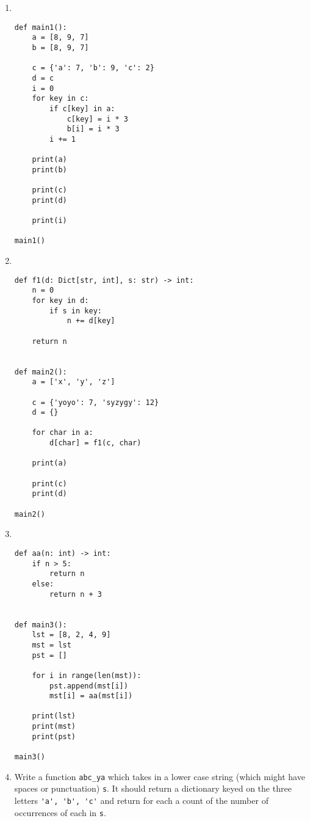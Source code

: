 \documentclass{article}
\begin{document}
\begin{enumerate}

\item \
\begin{verbatim}
def main1():
    a = [8, 9, 7]
    b = [8, 9, 7]

    c = {'a': 7, 'b': 9, 'c': 2}
    d = c
    i = 0
    for key in c:
        if c[key] in a:
            c[key] = i * 3
            b[i] = i * 3
        i += 1

    print(a)
    print(b)

    print(c)
    print(d)

    print(i)

main1()
\end{verbatim}




\newpage

\item \
\begin{verbatim}
def f1(d: Dict[str, int], s: str) -> int:
    n = 0
    for key in d:
        if s in key:
            n += d[key]

    return n


def main2():
    a = ['x', 'y', 'z']

    c = {'yoyo': 7, 'syzygy': 12}
    d = {}

    for char in a:
        d[char] = f1(c, char)

    print(a)

    print(c)
    print(d)

main2()

\end{verbatim}

\newpage
\item \

\begin{verbatim}
def aa(n: int) -> int:
    if n > 5:
        return n
    else:
        return n + 3


def main3():
    lst = [8, 2, 4, 9]
    mst = lst
    pst = []

    for i in range(len(mst)):
        pst.append(mst[i])
        mst[i] = aa(mst[i])

    print(lst)
    print(mst)
    print(pst)

main3()
\end{verbatim}

\eject
\item Write a function \verb|abc_ya| which takes in a lower case string (which might have spaces or punctuation) \verb|s|. It should return a dictionary keyed on the three letters \verb|'a', 'b', 'c'| and return for each a count of the number of occurrences of each in \verb|s|.


\end{enumerate}
\end{document}
